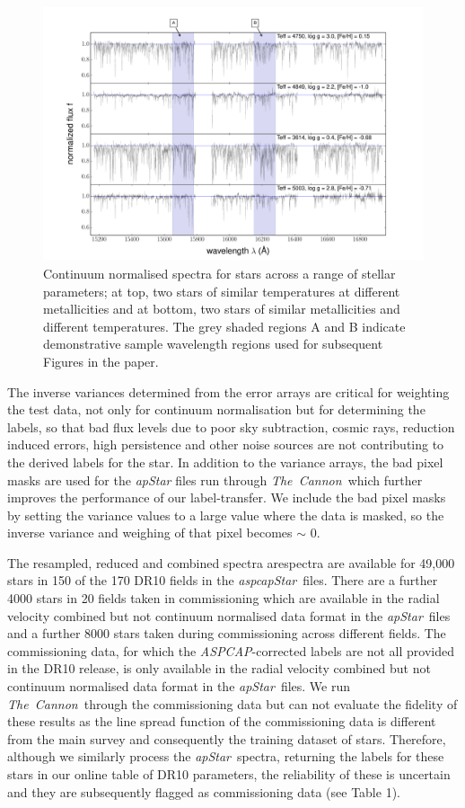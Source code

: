 \documentclass[12pt, preprint]{aastex}
\newcommand{\tc}{\textsl{The~Cannon}}
\newcommand{\aspcap}{\textsl{ASPCAP}}
\newcommand{\aspcapstar}{\textsl{aspcapStar}}
\newcommand{\apstar}{\textsl{apStar}}
\begin{document}
\begin{figure}[h!]
  \includegraphics[width=\hsize]{./plots/four_examples3.pdf}
\caption{Continuum normalised spectra for stars across a range of stellar parameters; at top, two stars of similar temperatures at different metallicities and at bottom, two stars of similar metallicities and different temperatures. The grey shaded regions A and B indicate demonstrative sample wavelength regions used for subsequent Figures in the paper.}
\label{fig:norm}
\end{figure}


The inverse variances determined from the error arrays are critical for weighting the test data, not only for continuum normalisation but for determining the labels, so that bad flux levels due to poor sky subtraction, cosmic rays, reduction induced errors, high persistence and other noise sources are not contributing to the derived labels for the star. In addition to the variance arrays, the bad pixel masks are used for the \textit{apStar} files run through \tc\, which further improves the performance of our label-transfer. We include the bad pixel masks by setting the variance values to a large value where the data is masked, so the inverse variance and weighing of that pixel becomes $\sim$ 0. 

The resampled, reduced and combined spectra arespectra are available for 49,000 stars in 150 of the 170 DR10 fields in the \aspcapstar\ files. There are a further 4000 stars in 20 fields taken in commissioning which are available in the radial velocity combined but not continuum normalised data format in the \apstar\ files and a further 8000 stars taken during commissioning across different fields. The commissioning data, for which the \aspcap-corrected labels are not all provided in the DR10 release, is only available in the radial velocity combined but not continuum normalised data format in the \apstar\ files. We run \tc\ through the commissioning data but can not evaluate the fidelity of these results as the line spread function of the commissioning data is different from the main survey and consequently the training dataset of stars. Therefore, although we similarly process the \apstar\ spectra, returning the labels for these stars in our online table of DR10 parameters, the reliability of these is uncertain and they are subsequently flagged as commissioning data (see Table 1).
\end{document}
